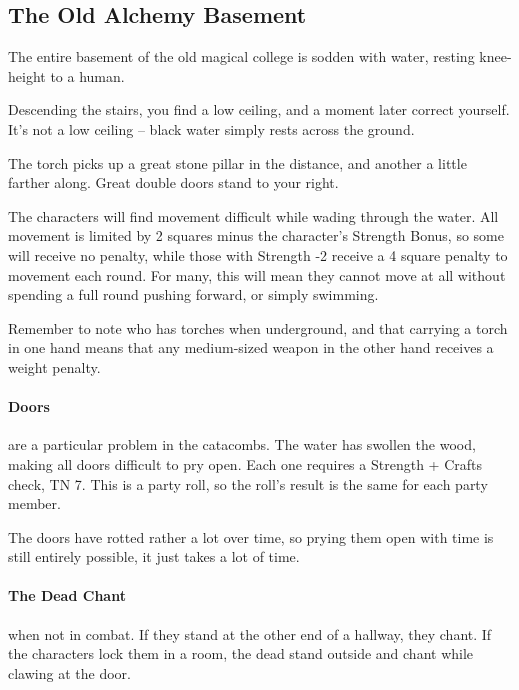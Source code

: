 \begin{multicols}{2}
\subsection{The Old Alchemy Basement}\label{old_alchemy_basement}\setcounter{list}{0}

The entire basement of the old magical college is sodden with water, resting knee-height to a human.

\begin{boxtext}
	Descending the stairs, you find a low ceiling, and a moment later correct yourself.  It's not a low ceiling -- black water simply rests across the ground.

	The torch picks up a great stone pillar in the distance, and another a little farther along.  Great double doors stand to your right.

\end{boxtext}

The characters will find movement difficult while wading through the water.  All movement is limited by 2 squares minus the character's Strength Bonus, so some will receive no penalty, while those with Strength -2 receive a 4 square penalty to movement each round.  For many, this will mean they cannot move at all without spending a full round pushing forward, or simply swimming.

Remember to note who has torches when underground, and that carrying a torch in one hand means that any medium-sized weapon in the other hand receives a weight penalty.

\paragraph{Doors} are a particular problem in the catacombs.  The water has swollen the wood, making all doors difficult to pry open.  Each one requires a Strength + Crafts check, TN 7.  This is a party roll, so the roll's result is the same for each party member.

The doors have rotted rather a lot over time, so prying them open with time is still entirely possible, it just takes a lot of time.

\paragraph{The Dead Chant} when not in combat.
If they stand at the other end of a hallway, they chant.
If the characters lock them in a room, the dead stand outside and chant while clawing at the door.


\end{multicols}
